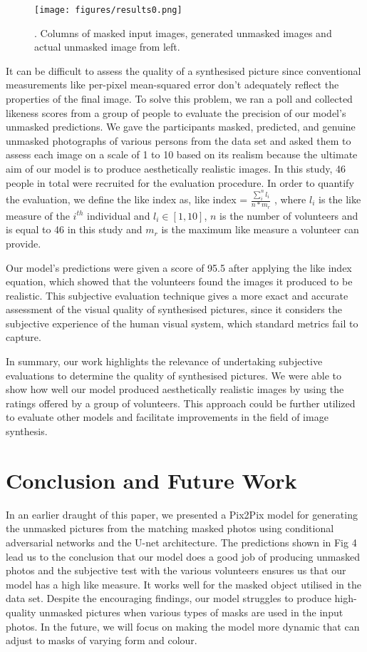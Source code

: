 \documentclass{./styles/svproc}
\begin{document}
\begin{figure}[ht]%
\centering
\texttt{[image: figures/results0.png]}
\caption{. Columns of masked input images, generated unmasked images and actual unmasked image from left.}\label{fig4}
\end{figure}

It can be difficult to assess the quality of a synthesised picture \cite{zhang2016colorful} since conventional measurements like per-pixel mean-squared error don't adequately reflect the properties of the final image. To solve this problem, we ran a poll and collected likeness scores from a group of people to evaluate the precision of our model's unmasked predictions. We gave the participants masked, predicted, and genuine unmasked photographs of various persons from the data set and asked them to assess each image on a scale of 1 to 10 based on its realism because the ultimate aim of our model is to produce aesthetically realistic images. In this study, 46 people in total were recruited for the evaluation procedure.
In order to quantify the evaluation, we define the like index as, like index = $\frac{\sum_{i}^{n}l_i}{n\ast m_r}$ , where $l_i$ is the like measure of the $i^{th}$ individual and $l_i \in [1, 10]$, $n$ is the number of volunteers and is equal to 46 in this study and $m_r$  is the maximum like measure a volunteer can provide. 

Our model's predictions were given a score of 95.5 after applying the like index equation, which showed that the volunteers found the images it produced to be realistic. This subjective evaluation technique gives a more exact and accurate assessment of the visual quality of synthesised pictures, since it considers the subjective experience of the human visual system, which standard metrics fail to capture. 

In summary, our work highlights the relevance of undertaking subjective evaluations to determine the quality of synthesised pictures. We were able to show how well our model produced aesthetically realistic images by using the ratings offered by a group of volunteers. This approach could be further utilized to evaluate other models and facilitate improvements in the field of image synthesis.

\section{Conclusion and Future Work}

In an earlier draught of this paper, we presented a Pix2Pix model for generating the unmasked pictures from the matching masked photos using conditional adversarial networks and the U-net architecture. The predictions shown in Fig 4 lead us to the conclusion that our model does a good job of producing unmasked photos and the subjective test with the various volunteers ensures us that our model has a high like measure. It works well for the masked object utilised in the data set. Despite the encouraging findings, our model struggles to produce high-quality unmasked pictures when various types of masks are used in the input photos. In the future, we will focus on making the model more dynamic that can adjust to masks of varying form and colour.
\end{document}
